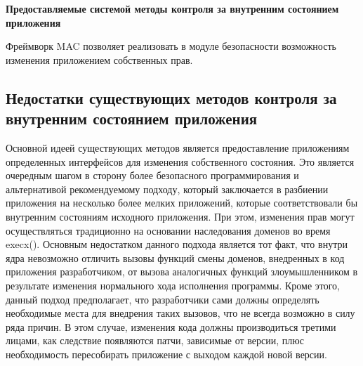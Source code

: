 {\bfseries Предоставляемые системой методы контроля за 
внутренним состоянием приложения} 

Фреймворк MAC позволяет реализовать в модуле 
безопасности возможность изменения приложением 
собственных прав. 

\subsection{Недостатки существующих методов контроля 
за внутренним состоянием приложения} 

Основной идеей существующих методов является 
предоставление приложениям определенных интерфейсов
для изменения собственного состояния. Это является 
очередным шагом в сторону более безопасного 
программирования и альтернативой рекомендуемому 
подходу, который заключается в разбиении приложения 
на несколько более мелких приложений, которые 
соответствовали бы внутренним состояниям 
исходного приложения. 
При этом, изменения прав могут осуществляться
традиционно на основании наследования доменов во время 
execx(). Основным недостатком данного подхода является 
тот факт, что внутри ядра невозможно отличить 
вызовы функций смены доменов, внедренных в код 
приложения разработчиком, от вызова 
аналогичных функций злоумышленником в результате 
изменения нормального хода исполнения программы.
Кроме этого, данный подход предполагает, что 
разработчики сами должны определять необходимые 
места для внедрения таких вызовов, что не всегда 
возможно в силу ряда причин. В этом случае, 
изменения кода должны производиться третими 
лицами, как следствие появляются патчи, зависимые 
от версии, плюс необходимость пересобирать 
приложение с выходом каждой новой версии. 
\bigskip

